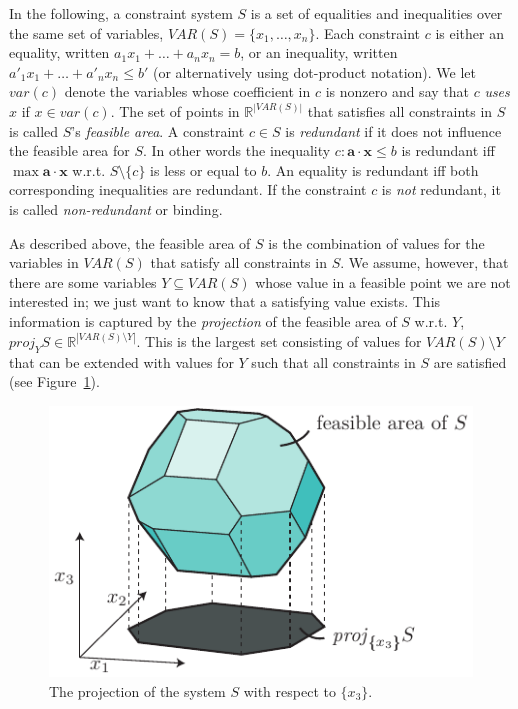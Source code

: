 \documentclass[citeauthoryear]{llncs}
\newcommand{\var}{\mathit{var}}
\newcommand{\VAR}{\mathit{VAR}}
\newcommand{\mi}{\mathit}
\newcommand{\ve}{\mathbf}
\begin{document}
In the following, a constraint system $S$ is a set of equalities and inequalities over the same set of variables, $\VAR(S)=\{x_1,\ldots, x_n\}$. Each constraint $c$ is either an equality, written $a_1x_1 + \ldots +a_nx_n = b$, or an inequality, written $a'_1x_1 + \ldots +a'_nx_n\leq b'$ (or alternatively using dot-product notation). We let $\var(c)$ denote the variables whose coefficient in $c$ is nonzero and say that $c$ \emph{uses} $x$ if $x\in \var(c)$. The set of points in $\mathbb{R}^{|\VAR(S)|}$ that satisfies all constraints in $S$ is called $S$'s \emph{feasible area}. A constraint $c\in S$ is \emph{redundant} if it does not influence the feasible area for $S$. In other words the inequality $c: \ve{a}\cdot\ve{x}\leq b$ is redundant iff $\max \ve{a}\cdot\ve{x}$ w.r.t. $S\setminus\{c\}$ is less or equal to $b$. An equality is redundant iff both corresponding inequalities are redundant. If the constraint $c$ is \emph{not} redundant, it is called \emph{non-redundant} or binding.

As described above, the feasible area of $S$ is the combination of values for the variables in $\VAR(S)$ that satisfy all constraints in $S$. We assume, however, that there are some variables $Y\subseteq \VAR(S)$ whose value in a feasible point we are not interested in; we just want to know that a satisfying value exists. This information is captured by the \emph{projection} of the feasible area of $S$ w.r.t. $Y$, $\mi{proj}_YS\in\mathbb{R}^{|\VAR(S)\setminus Y|}$. This is the largest set consisting of values for $\VAR(S)\setminus Y$ that can be extended with values for $Y$ such that all constraints in $S$ are satisfied (see Figure~\ref{fig:proj}). 

\begin{figure}[htbp]
	\centering
		\includegraphics{figures/projection2.pdf}
	\caption{The projection of the system $S$ with respect to $\{x_3\}$.}
	\label{fig:proj}
\end{figure}
\end{document}
